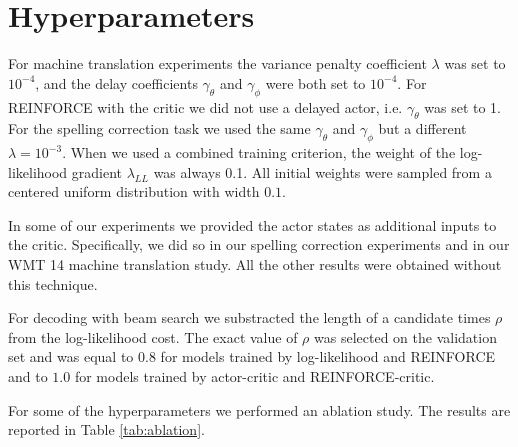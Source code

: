 \section{Hyperparameters}
\label{sec:hyperparameters}

For machine translation experiments the variance penalty coefficient $\lambda$
was set to $10^{-4}$, and the delay coefficients $\gamma_{\theta}$ and
$\gamma_{\phi}$ were both set to $10^{-4}$. For REINFORCE with the critic we did not use 
a delayed actor, i.e. $\gamma_{\theta}$ was set to 1. For the spelling correction
task we used the same $\gamma_{\theta}$ and $\gamma_{\phi}$ but a different 
$\lambda=10^{-3}$. When we used a combined training criterion, the weight of the log-likelihood gradient $\lambda_{LL}$ was always 0.1. All initial weights were sampled from a centered uniform distribution with
width $0.1$.

In some of our experiments we provided the actor states as additional inputs to
the critic.  Specifically, we did so in our spelling correction experiments and
in our WMT 14 machine translation study. All the other results were obtained
without this technique.

For decoding with beam search we substracted the length of a candidate
times $\rho$ from the log-likelihood cost. The exact value of $\rho$ 
was selected on the validation set and was equal to $0.8$
for models trained by log-likelihood and REINFORCE and to $1.0$
for models trained by actor-critic and REINFORCE-critic.

For some of the hyperparameters we performed an ablation study. The results are reported in Table \ref{tab:ablation}.

